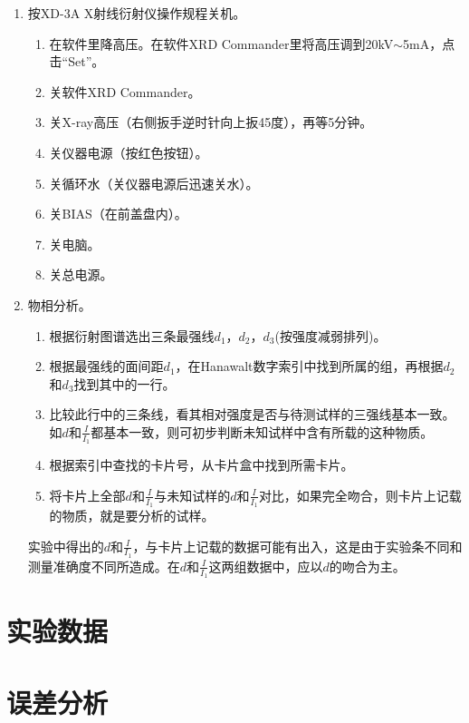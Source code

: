 \documentclass[a4paper]{article}
\begin{document}
\begin{enumerate}
\item 按XD-3A X射线衍射仪操作规程关机。
\begin{enumerate}
	\item 在软件里降高压。在软件XRD Commander里将高压调到20kV$ \sim $5mA，点击“Set”。
	\item 关软件XRD Commander。
	\item 关X-ray高压（右侧扳手逆时针向上扳45度），再等5分钟。
	\item 关仪器电源（按红色按钮）。
	\item 关循环水（关仪器电源后迅速关水）。
	\item 关BIAS（在前盖盘内）。
	\item 关电脑。
    \item 关总电源。
\end{enumerate}
\item 物相分析。
\begin{enumerate}
\item 根据衍射图谱选出三条最强线$d_1$，$d_2$，$d_3$(按强度减弱排列)。
\item 根据最强线的面间距$d_1$，在Hanawalt数字索引中找到所属的组，再根据$d_2$和$d_3$找到其中的一行。
\item 比较此行中的三条线，看其相对强度是否与待测试样的三强线基本一致。如$d$和$\frac{I}{I_1}$都基本一致，则可初步判断未知试样中含有所载的这种物质。
\item 根据索引中查找的卡片号，从卡片盒中找到所需卡片。
\item 将卡片上全部$d$和$\frac{I}{I_1}$与未知试样的$d$和$\frac{I}{I_1}$对比，如果完全吻合，则卡片上记载的物质，就是要分析的试样。
\end{enumerate}
实验中得出的$d$和$\frac{I}{I_1}$，与卡片上记载的数据可能有出入，这是由于实验条不同和测量准确度不同所造成。在$d$和$\frac{I}{I_1}$这两组数据中，应以$d$的吻合为主。
\end{enumerate}

\section{实验数据}

\section{误差分析}
\end{document}
